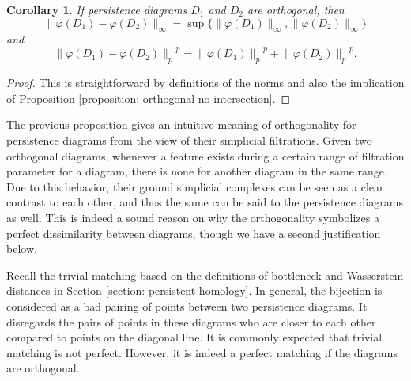 \documentclass[sn-mathphys-num]{sn-jnl}%
\theoremstyle{thmstyleone}%
\newtheorem{corollary}[theorem]{Corollary}
\theoremstyle{thmstyletwo}%
\theoremstyle{thmstylethree}%
\begin{document}
\begin{corollary}
	If persistence diagrams $D_1$ and $D_2$ are orthogonal, then
	\begin{equation*}
		\|\varphi(D_1)-\varphi(D_2)\|_{\infty}=\sup \big\{\|\varphi(D_1)\|_{\infty},\|\varphi(D_2)\|_{\infty}\big\}
	\end{equation*}
	and
	\begin{equation*}
		{\|\varphi(D_1)-\varphi(D_2)\|_p}^p={\|\varphi(D_1)\|_p}^p + {\|\varphi(D_2)\|_p}^p.
	\end{equation*}
\end{corollary}
\begin{proof}
	This is straightforward by definitions of the norms and also the implication of Proposition \ref{proposition: orthogonal no intersection}.
\end{proof}

The previous proposition gives an intuitive meaning of orthogonality for persistence diagrams from the view of their simplicial filtrations. Given two orthogonal diagrams, whenever a feature exists during a certain range of filtration parameter for a diagram, there is none for another diagram in the same range. Due to this behavior, their ground simplicial complexes can be seen as a clear contrast to each other, and thus the same can be said to the persistence diagrams as well. This is indeed a sound reason on why the orthogonality symbolizes a perfect dissimilarity between diagrams, though we have a second justification below.

Recall the trivial matching based on the definitions of bottleneck and Wasserstein distances in Section \ref{section: persistent homology}. In general, the bijection is considered as a bad pairing of points between two persistence diagrams. It disregards the pairs of points in these diagrams who are closer to each other compared to points on the diagonal line. It is commonly expected that trivial matching is not perfect. However, it is indeed a perfect matching if the diagrams are orthogonal.
\end{document}
